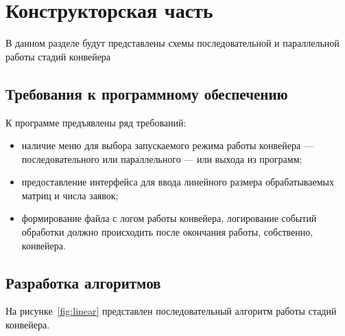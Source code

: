 \chapter{Конструкторская часть}

В данном разделе будут представлены схемы последовательной и параллельной работы стадий конвейера

\section{Требования к программному обеспечению}

К программе предъявлены ряд требований:

\begin{itemize}[label=---]
	\item наличие меню для выбора запускаемого режима работы конвейера --- последовательного или параллельного — или выхода из программ;
	\item предоставление интерфейса для ввода линейного размера обрабатываемых матриц и числа заявок;
	\item формирование файла с логом работы конвейера, логирование событий обработки должно происходить после окончания работы, собственно, конвейера.
\end{itemize}

\section{Разработка алгоритмов}

На рисунке~\ref{fig:linear} представлен последовательный алгоритм работы стадий конвейера.

